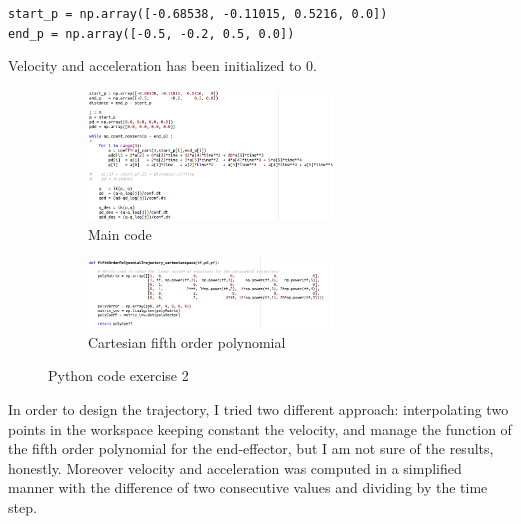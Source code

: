 \documentclass[11pt,a4paper]{article}
\begin{document}
\smallskip

\texttt{start\_p = np.array([-0.68538, -0.11015, 0.5216, 0.0]) }\\
\texttt{end\_p   = np.array([-0.5, -0.2, 0.5, 0.0]) }

\smallskip

Velocity and acceleration has been initialized to 0.
\begin{figure}[H]
	\begin{subfigure}[b]{0.5\textwidth}
		\centering
		\includegraphics[width=65mm]{images/cod2_es2.png}
		\caption{Main code}
	\end{subfigure}
	\begin{subfigure}[b]{0.5\textwidth}
		\centering
		\includegraphics[width=65mm]{images/cod1_es2.png}
		\caption{Cartesian fifth order polynomial}
	\end{subfigure}
	\caption{Python code exercise 2}
	\label{codici}
\end{figure}
In order to design the trajectory, I tried two different approach: interpolating two points in the workspace keeping constant the velocity, and manage the function of the fifth order polynomial for the end-effector, but I am not sure of the results, honestly. 
Moreover velocity and acceleration was computed in a simplified manner with the difference of two consecutive values and dividing by the time step.
\end{document}
